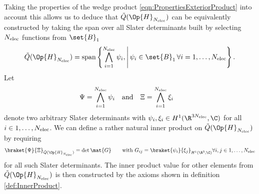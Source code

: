 Taking the properties of the wedge product \eqref{eqn:PropertiesExteriorProduct}
into account this allows us to deduce that $\tilde{Q}(\Op{H}_{\Nelec})$ can be equivalently
constructed by taking the span over all Slater determinants built by selecting
$N_\text{elec}$ functions from $\set{B}_1$
\begin{equation}
	\label{eqn:FormDomainSlaterDeterminants}
	\tilde{Q}(\Op{H}_{\Nelec}) = \spacespan
	\left\{ \bigwedge_{i=1}^{\Nelec} \psi_i
	, \middle| \, \psi_i \in \set{B}_1 \, \forall i=1,\ldots,\Nelec
	\right\}.
\end{equation}
Let
\begin{align*}
	\Psi &= \bigwedge_{i=1}^{N_\text{elec}} \psi_i &&\text{and}& \Xi &= \bigwedge_{i=1}^{N_\text{elec}} \xi_i
\end{align*}
denote two arbitrary Slater determinants with
$\psi_i, \xi_i \in H^1(\R^{3\Nelec}, \C)$ for all $i \in 1,\ldots,N_\text{elec}$.
We can define a rather natural inner product
on $\tilde{Q}(\Op{H}_{\Nelec})$ by requiring%
\begin{align}
	\braket{\Psi}{\Xi}_{\tilde{Q}(\Op{H}_{\Nelec})} = \det \mat{G}
	\qquad
	\text{with } G_{ij} = \braket{\psi_i}{\xi_j}_{H^1(\R^3, \C)} \forall i,j \in 1,\ldots,\Nelec
	\label{eqn:InnerProductFormDomain}
\end{align}
for all such Slater determinants.
The inner product value for other elements from $\tilde{Q}(\Op{H}_{\Nelec})$
is then constructed by the axioms shown in definition \vref{def:InnerProduct}.

